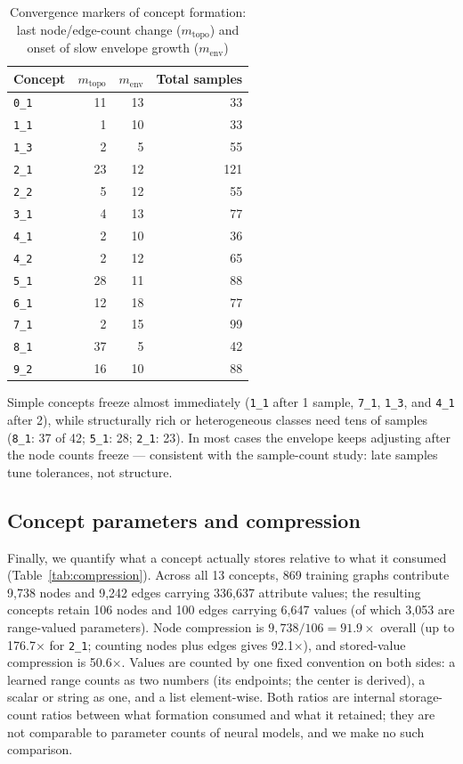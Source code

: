 \documentclass[conference]{IEEEtran}
\newcommand{\cid}[1]{\texttt{#1}}   %
\begin{document}
\begin{table}[!t]
\caption{Convergence markers of concept formation: last node/edge-count
change ($m_\text{topo}$) and onset of slow envelope growth
($m_\text{env}$)}
\label{tab:convergence}
\centering
\begin{tabular}{lrrr}
\toprule
Concept & $m_\text{topo}$ & $m_\text{env}$ & Total samples \\
\midrule
\cid{0\_1} & 11 & 13 & 33 \\
\cid{1\_1} & 1 & 10 & 33 \\
\cid{1\_3} & 2 & 5 & 55 \\
\cid{2\_1} & 23 & 12 & 121 \\
\cid{2\_2} & 5 & 12 & 55 \\
\cid{3\_1} & 4 & 13 & 77 \\
\cid{4\_1} & 2 & 10 & 36 \\
\cid{4\_2} & 2 & 12 & 65 \\
\cid{5\_1} & 28 & 11 & 88 \\
\cid{6\_1} & 12 & 18 & 77 \\
\cid{7\_1} & 2 & 15 & 99 \\
\cid{8\_1} & 37 & 5 & 42 \\
\cid{9\_2} & 16 & 10 & 88 \\
\bottomrule
\end{tabular}
\end{table}

Simple concepts
freeze almost immediately (\cid{1\_1} after 1 sample,
\cid{7\_1}, \cid{1\_3}, and \cid{4\_1} after 2), while structurally rich
or heterogeneous classes need tens of samples (\cid{8\_1}: 37 of 42;
\cid{5\_1}: 28; \cid{2\_1}: 23). In most cases the envelope keeps
adjusting after the node counts freeze --- consistent with the
sample-count
study: late samples tune tolerances, not structure.

\subsection{Concept parameters and compression}
\label{sec:compression}

Finally, we quantify what a concept actually stores relative to what it
consumed (Table~\ref{tab:compression}). Across all 13 concepts, 869
training graphs contribute 9{,}738 nodes and 9{,}242 edges carrying
336{,}637 attribute values; the resulting concepts retain 106 nodes and
100 edges carrying 6{,}647 values (of which 3{,}053 are range-valued
parameters). Node compression is $9{,}738/106 = 91.9\times$ overall
(up to 176.7$\times$ for \cid{2\_1}; counting nodes plus edges gives
92.1$\times$), and stored-value compression is 50.6$\times$. Values are
counted by one fixed convention on both sides: a learned range counts as
two numbers (its endpoints; the center is derived), a scalar or string as
one, and a list element-wise. Both ratios are internal storage-count
ratios between what formation consumed and what it retained; they are not
comparable to parameter counts of neural models, and we make no such
comparison.
\end{document}
